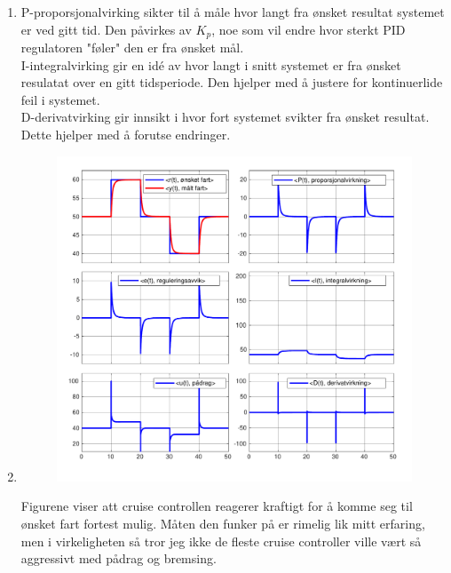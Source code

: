 \documentclass[answers,11pt]{exam}
\begin{document}
\begin{enumerate}[label=\alph*)]
\begin{tcolorbox}
    \begin{enumerate}[label=q\arabic*)]
      \item
        P-proporsjonalvirking sikter til å måle hvor langt fra ønsket resultat systemet er 
        ved gitt tid. Den påvirkes av $K_p$, noe som vil endre hvor sterkt PID regulatoren "føler" 
        den er fra ønsket mål. \\
        I-integralvirking gir en idé av hvor langt i snitt systemet er fra ønsket resulatat over en 
        gitt tidsperiode. Den hjelper med å justere for kontinuerlide feil i systemet. \\
        D-derivatvirking gir innsikt i hvor fort systemet svikter fra ønsket resultat. Dette hjelper med 
        å forutse endringer.
      \item
      \parbox{\textwidth}{
        \begin{figure}[H]
          \centering
          \hspace{0mm}\scalebox{0.55}
          {\includegraphics{figurer/cruise.pdf}}
          \label{fig:2q2}
        \end{figure}
      }
        Figurene viser att cruise controllen reagerer kraftigt for å komme seg til ønsket fart 
        fortest mulig. Måten den funker på er rimelig lik mitt erfaring, men i virkeligheten 
        så tror jeg ikke de fleste cruise controller ville vært så aggressivt med pådrag og bremsing.

\end{enumerate}
\end{tcolorbox}
\end{enumerate}
\end{document}
